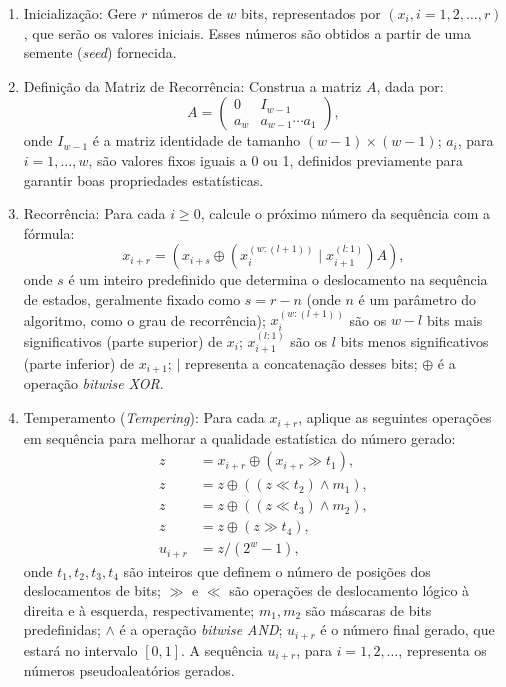 \begin{enumerate}[noitemsep]
    \item Inicialização: Gere $r$ números de $w$ bits, representados por 
      $(x_i, i=1,2,\ldots,r)$, que serão os valores iniciais. Esses números são
      obtidos a partir de uma semente (\textit{seed}) fornecida.

    \item Definição da Matriz de Recorrência: Construa a matriz $A$, dada por:
    \[
    A = \begin{pmatrix}
    0 & I_{w-1} \\
    a_w & a_{w-1} \cdots a_1
    \end{pmatrix},
    \]
    onde $I_{w-1}$ é a matriz identidade de tamanho $(w-1) \times (w-1)$; 
    $a_i$, para $i = 1, \ldots, w$, são valores fixos iguais a 0 ou 1, definidos previamente para garantir boas propriedades estatísticas.
    
    \item Recorrência: Para cada $i \geq 0$, calcule o próximo número da sequência com a fórmula:
    \[
    x_{i+r} = (x_{i+s} \oplus (x_i^{(w:(l+1))} \mid x_{i+1}^{(l:1)}) A),
    \]
    onde
    $s$ é um inteiro predefinido que determina o deslocamento na sequência de estados,
    geralmente fixado como $s = r - n$ (onde $n$ é um parâmetro do algoritmo, como o grau de recorrência);
    $x_i^{(w:(l+1))}$ são os $w-l$ bits mais significativos (parte superior) de $x_i$;
    $x_{i+1}^{(l:1)}$ são os $l$ bits menos significativos (parte inferior) de $x_{i+1}$;
    $\mid$ representa a concatenação desses bits;
    $\oplus$ é a operação \textit{bitwise XOR}.

    \item Temperamento (\textit{Tempering}): Para cada $x_{i+r}$, aplique as seguintes operações em sequência para melhorar a qualidade estatística do número gerado:
    \[
    \begin{aligned}
    z &= x_{i+r} \oplus (x_{i+r} \gg t_1), \\
    z &= z \oplus ((z \ll t_2) \land m_1), \\
    z &= z \oplus ((z \ll t_3) \land m_2), \\
    z &= z \oplus (z \gg t_4), \\
    u_{i+r} &= z / (2^w - 1),
    \end{aligned}
    \]
    onde $t_1, t_2, t_3, t_4$ são inteiros que definem o número de posições dos deslocamentos de bits;
    $\gg$ e $\ll$ são operações de deslocamento lógico à direita e à esquerda, respectivamente;
    $m_1, m_2$ são máscaras de bits predefinidas;
    $\land$ é a operação \textit{bitwise AND};
    $u_{i+r}$ é o número final gerado, que estará no intervalo $[0, 1]$.
    A sequência $u_{i+r}$, para $i = 1, 2, \ldots$, representa os números pseudoaleatórios gerados.
\end{enumerate}

